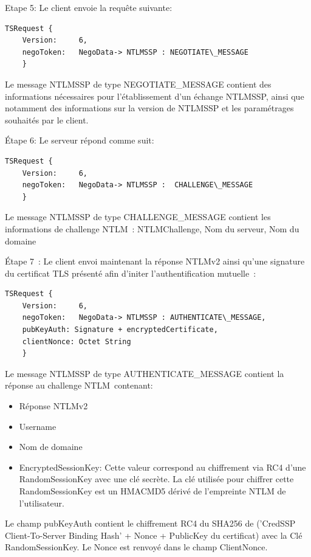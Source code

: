 Etape 5: Le client envoie la requête suivante:

\begin{lstlisting}[frame=single,basicstyle=\tiny]
TSRequest {
	Version:     6,
	negoToken:   NegoData-> NTLMSSP : NEGOTIATE\_MESSAGE
	}
\end{lstlisting}

Le message NTLMSSP de type NEGOTIATE\_MESSAGE contient des informations n\'ecessaires pour l’établissement d’un échange NTLMSSP, ainsi que notamment des informations sur la version de NTLMSSP et les paramétrages souhaités par le client.

Étape 6: Le serveur r\'epond comme suit:

\begin{lstlisting}[frame=single,basicstyle=\tiny]
TSRequest {
	Version:     6,
	negoToken:   NegoData-> NTLMSSP :  CHALLENGE\_MESSAGE
	}
\end{lstlisting}


Le message NTLMSSP de type CHALLENGE\_MESSAGE contient les informations de challenge NTLM : NTLMChallenge, Nom du serveur, Nom du domaine

Étape 7 :
Le client envoi maintenant la r\'eponse NTLMv2 ainsi qu'une signature du certificat TLS présenté afin d'initer l'authentification mutuelle :

\begin{lstlisting}[frame=single,basicstyle=\tiny]
TSRequest {
	Version:     6,
	negoToken:   NegoData-> NTLMSSP : AUTHENTICATE\_MESSAGE,
	pubKeyAuth: Signature + encryptedCertificate,
	clientNonce: Octet String
	}
\end{lstlisting}

Le message NTLMSSP de type AUTHENTICATE\_MESSAGE contient la r\'eponse au challenge NTLM contenant:
\begin{itemize}
	\item R\'eponse NTLMv2
	\item Username
	\item Nom de domaine
	\item EncryptedSessionKey: Cette valeur correspond au chiffrement via RC4 d’une RandomSessionKey avec une cl\'e secrète. La clé utilisée pour chiffrer cette RandomSessionKey est un HMACMD5 dérivé de l'empreinte NTLM de l’utilisateur.
\end{itemize}
Le champ pubKeyAuth contient le chiffrement RC4 du SHA256 de (’CredSSP Client-To-Server Binding Hash’ + Nonce + PublicKey du certificat) avec la Cl\'e RandomSessionKey.
Le Nonce est renvoy\'e dans le champ ClientNonce.

